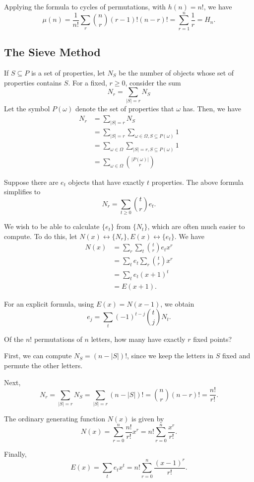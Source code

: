 \documentclass[11pt]{article}
\renewcommand{\>}{\rangle}
\newcommand{\<}{\langle}
\begin{document}
\begin{example} Applying the formula to cycles of permutations, with $h(n) = n!$, we have 
$$\mu (n) = \frac{1}{n!} \sum_{r} \binom{n}{r} (r-1)! (n-r)! = \sum_{r=1}^n \frac{1}{r} = H_n.$$
\end{example}
\pagebreak
\subsection{The Sieve Method}
If $S \subseteq P$ is a set of properties, let $N_S$ be the number of objects whose set of properties contains $S$.  For a fixed, $r \ge 0$, consider the sum
$$N_r = \sum_{|S| = r} N_S$$
Let the symbol $P(\omega)$ denote the set of properties that $\omega$ has.  Then, we have 
\begin{align*}
N_r &= \sum_{|S| = r} N_S \\
&= \sum_{|S| = r} \sum_{\omega\in \Omega, S \subseteq P(\omega)} 1 \\
&= \sum_{\omega \in \Omega}  \sum_{|S| = r, S \subseteq P(\omega)} 1 \\
&=  \sum_{\omega \in \Omega} \binom{|P(\omega)|}{r}
\end{align*}

Suppose there are $e_t$ objects that have exactly $t$ properties.  The above formula simplifies to
$$N_r = \sum_{t \ge 0} \binom{t}{r} e_t.$$

We wish to be able to calculate $\{e_t\}$ from $\{N_t\}$, which are often much easier to compute.  To do this, let $N(x) \leftrightarrow \{N_r\},  E(x)\leftrightarrow \{e_t\}$.  We have 
\begin{align*}
N(x) &= \sum_r \sum_t \binom{t}{r} e_t x^r \\
&= \sum_t  e_t \sum_r \binom{t}{r} x^r \\
&= \sum_t e_t(x+1)^t \\
&= E(x + 1).
\end{align*}

For an explicit formula, using $E(x) = N(x-1)$, we obtain
$$e_j = \sum_t (-1)^{t-j} \binom{t}{j} N_t.  $$
\begin{example} Of the $n!$ permutations of $n$ letters, how many have exactly $r$ fixed points?  

First, we can compute $N_S = (n-|S|)!$, since we keep the letters in $S$ fixed and permute the other letters.  

Next,
$$N_r = \sum_{|S|  = r} N_S = \sum_{|S| = r} (n - |S|)! =  \binom{n}{r} (n-r)! = \frac{n!}{r!}.$$

The ordinary generating function $N(x)$ is given by 
$$N(x) = \sum_{r=0}^n \frac{n!}{r!} x^r = n! \sum_{r=0}^n \frac{x^r}{r!}.$$

Finally,
$$E(x) = \sum_t e_tx^t = n! \sum_{r=0}^n \frac{(x-1)^r}{r!}.$$
\end{example}
\end{document}
